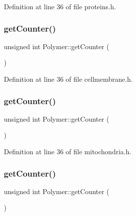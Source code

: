 Definition at line 36 of file proteins.\+h.

\mbox{\label{class_polymer_a8346d821e5f8690d7816ba1d40036b69}} 
\subsubsection{\texorpdfstring{get\+Counter()}{getCounter()}\hspace{0.1cm}{\footnotesize\ttfamily [3/10]}}
{\footnotesize\ttfamily unsigned int Polymer\+::get\+Counter (\begin{DoxyParamCaption}{ }\end{DoxyParamCaption})\hspace{0.3cm}{\ttfamily [inline]}}



Definition at line 36 of file cellmembrane.\+h.

\mbox{\label{class_polymer_a8346d821e5f8690d7816ba1d40036b69}} 
\subsubsection{\texorpdfstring{get\+Counter()}{getCounter()}\hspace{0.1cm}{\footnotesize\ttfamily [4/10]}}
{\footnotesize\ttfamily unsigned int Polymer\+::get\+Counter (\begin{DoxyParamCaption}{ }\end{DoxyParamCaption})\hspace{0.3cm}{\ttfamily [inline]}}



Definition at line 36 of file mitochondria.\+h.

\mbox{\label{class_polymer_a8346d821e5f8690d7816ba1d40036b69}} 
\subsubsection{\texorpdfstring{get\+Counter()}{getCounter()}\hspace{0.1cm}{\footnotesize\ttfamily [5/10]}}
{\footnotesize\ttfamily unsigned int Polymer\+::get\+Counter (\begin{DoxyParamCaption}{ }\end{DoxyParamCaption})\hspace{0.3cm}{\ttfamily [inline]}}



